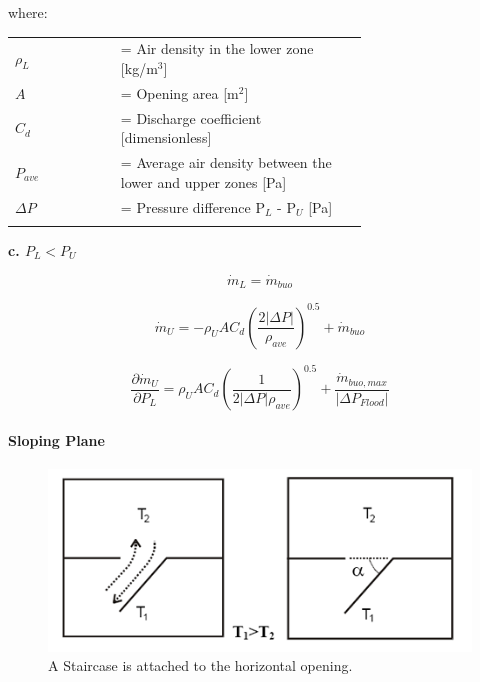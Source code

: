 where:

\begin{tabular}{lp{0.7\linewidth}}
\\
$\rho_L$ &= Air density in the lower zone [kg/m\(^{3}\)]\\
$A$ &= Opening area [m\(^{2}\)]\\
$C_d$ &= Discharge coefficient [dimensionless]\\
$Ρ_{ave}$ &= Average air density between the lower and upper zones [Pa]\\
$\Delta P$ &= Pressure difference P\(_{L}\) - P\(_{U}\) [Pa]\\
\\
\end{tabular}

\textbf{c.  $P_L < P_U$}

\begin{equation}
\dot{m}_L = \dot{m}_{buo}
\end{equation}

\begin{equation}
\dot{m}_U =  - \rho_U A C_d \left( \frac{2\left| \Delta P \right|}{\rho_{ave}} \right)^{0.5} + \dot{m}_{buo}
\end{equation}

\begin{equation}
\frac{\partial \dot{m}_U}{\partial P_L} = \rho_U A C_d \left( \frac{1}{2 \left| \Delta P \right| \rho_{ave}} \right)^{0.5} + \frac{\dot{m}_{buo,max}}{\left| \Delta P_{Flood} \right|}
\end{equation}

\paragraph{Sloping Plane}\label{sloping-plane}

\begin{figure}[hbtp] %
\centering
\includegraphics[width=0.9\linewidth, height=0.9\textheight, keepaspectratio=true]{media/image2741.png}
\caption{A Staircase is attached to the horizontal opening. \protect \label{fig:a-staircase-is-attached-to-the-horizontal}}
\end{figure}

